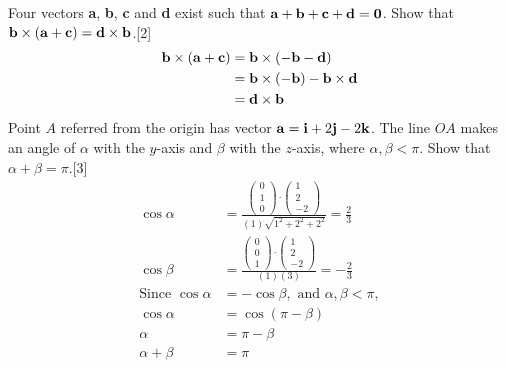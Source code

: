 \documentclass[12pt, a4 paper]{article}
\begin{document}
\begin{outline}[enumerate]
	\color{black}
	\2 Four vectors \textbf{a}, \textbf{b}, \textbf{c} and \textbf{d} exist such that ${\bf{a}} + {\bf{b}} + {\bf{c}} + {\bf{d}} = {\bf{0}}$. Show that ${\bf{b}} \times ({\bf{a}} + {\bf{c}}) = {\bf{d}} \times {\bf{b}}$.\hfill[2]
	\color{blue}
	\begin{align*}
		{\bf{b}} \times ({\bf{a}} + {\bf{c}}) & = {\bf{b}} \times ( - {\bf{b}} - {\bf{d}})                 \\
		                                      & = {\bf{b}} \times ( - {\bf{b}}) - {\bf{b}} \times {\bf{d}} \\
		                                      & = {\bf{d}} \times {\bf{b}}
	\end{align*}
	\color{black}
	\2 Point $A$ referred from the origin has vector ${\bf{a}} = {\bf{i}} + 2{\bf{j}} - 2{\bf{k}}$. The line $OA$ makes an angle of $\alpha $ with the $y$-axis and $\beta $ with the $z$-axis, where $\alpha ,\beta  < \pi $. Show that $\alpha  + \beta  = \pi $.\hfill[3]
	\color{blue}
	\begin{align*}
		\cos \alpha                  & = \frac{{\left( {\begin{array}{*{20}{c}}0               \\1\\0\end{array}} \right) \cdot \left( {\begin{array}{*{20}{c}}1\\2\\{ - 2}\end{array}} \right)}}{{(1)\sqrt {{1^2} + {2^2} + {2^2}} }} = \frac{2}{3} \\
		\cos \beta                   & = \frac{{\left( {\begin{array}{*{20}{c}}0               \\0\\1\end{array}} \right) \cdot \left( {\begin{array}{*{20}{c}}1\\2\\{ - 2}\end{array}} \right)}}{{(1)(3)}} =  - \frac{2}{3} \\
		{\textrm{Since }}\cos \alpha & =  - \cos \beta ,{\textrm{ and }}\alpha ,\beta  < \pi , \\
		\cos \alpha                  & = \cos (\pi  - \beta )                                  \\
		\alpha                       & = \pi  - \beta                                          \\
		\alpha  + \beta              & = \pi
	\end{align*}



\end{outline}
\end{document}

